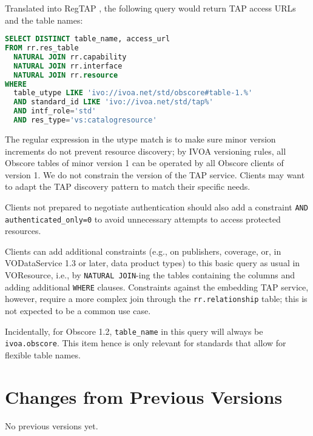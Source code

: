 \documentclass[11pt,a4paper]{ivoa}
\begin{document}
Translated into RegTAP \citep{2019ivoa.spec.1011D}, the following query
would return TAP access URLs and the table names:

\begin{lstlisting}[language=SQL]
SELECT DISTINCT table_name, access_url
FROM rr.res_table
  NATURAL JOIN rr.capability
  NATURAL JOIN rr.interface
  NATURAL JOIN rr.resource
WHERE
  table_utype LIKE 'ivo://ivoa.net/std/obscore#table-1.%'
  AND standard_id LIKE 'ivo://ivoa.net/std/tap%'
  AND intf_role='std'
  AND res_type='vs:catalogresource'
\end{lstlisting}

The regular expression in the utype match is to make sure minor version
increments do not prevent resource discovery; by IVOA versioning rules,
all Obscore tables of minor version 1 can be operated by all Obscore
clients of version 1.  We do not constrain the version of the TAP
service. Clients may want to adapt the TAP discovery pattern to match
their specific needs.

Clients not prepared to negotiate authentication should also add a
constraint \verb|AND authenticated_only=0| to avoid unnecessary attempts
to access protected resources.

Clients can add additional constraints (e.g., on publishers, coverage,
or, in VODataService 1.3 or later, data product types) to this basic
query as usual in VOResource, i.e., by \verb|NATURAL JOIN|-ing the
tables containing the columns and adding additional \verb|WHERE|
clauses.  Constraints against the embedding TAP service, however,
require a more complex join through the \verb|rr.relationship| table;
this is not expected to be a common use case.

Incidentally, for Obscore 1.2, \verb|table_name| in this query will always be
\verb|ivoa.obscore|.  This item hence is only relevant for standards
that allow for flexible table names.

\appendix
\section{Changes from Previous Versions}

No previous versions yet.



\end{document}
